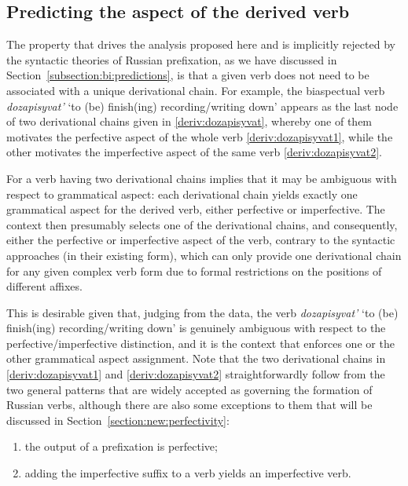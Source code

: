 \subsection{Predicting the aspect of the derived verb}\label{subsection:predict}
The property that drives the analysis proposed here and is implicitly rejected by the syntactic theories of Russian prefixation, as we have discussed in Section~\ref{subsection:bi:predictions}, is that a given verb does not need to be associated with a unique derivational chain. For example, the biaspectual verb \textit{dozapisyvat'} `to (be) finish(ing) recording/writing down' appears as the last node of two derivational chains given in \ref{deriv:dozapisyvat}, whereby one of them motivates the perfective aspect of the whole verb \ref{deriv:dozapisyvat1}, while the other motivates the imperfective aspect of the same verb \ref{deriv:dozapisyvat2}.

For a verb having two derivational chains implies that it may be ambiguous with respect to grammatical aspect: each derivational chain yields exactly one grammatical aspect for the derived verb, either perfective or imperfective. The context then presumably selects one of the derivational chains, and consequently, either the perfective or imperfective aspect of the verb, contrary to the syntactic approaches (in their existing form), which can only provide one derivational chain for any given complex verb form due to formal restrictions on the positions of different affixes.

This is desirable given that, judging from the data, the verb \textit{dozapisyvat'} `to (be) finish(ing) recording/writing down' is genuinely ambiguous with respect to the perfective/imperfective distinction, and it is the context that enforces one or the other grammatical aspect assignment. Note that the two derivational chains in \ref{deriv:dozapisyvat1} and \ref{deriv:dozapisyvat2} straightforwardly follow from the two general patterns that are widely accepted as governing the formation of Russian verbs, although there are also some exceptions to them that will be discussed in Section~\ref{section:new:perfectivity}:

\begin{enumerate}
\item the output of a prefixation is perfective;   
\item adding the imperfective suffix to a verb yields an imperfective verb. 
\end{enumerate}

